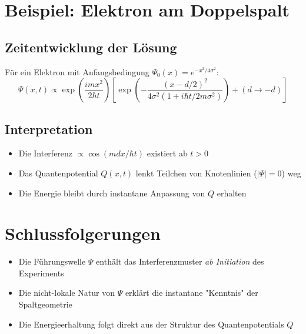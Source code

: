 \documentclass[12pt]{article}
\begin{document}
\section{Beispiel: Elektron am Doppelspalt}

\subsection{Zeitentwicklung der Lösung}
Für ein Elektron mit Anfangsbedingung $\Psi_0(x) = e^{-x^2/4\sigma^2}$:
\begin{equation}
\Psi(x,t) \propto \exp\left( \frac{imx^2}{2\hbar t} \right) \left[ \exp\left( -\frac{(x-d/2)^2}{4\sigma^2(1 + i\hbar t/2m\sigma^2)} \right) + (d \to -d) \right]
\end{equation}

\subsection{Interpretation}
\begin{itemize}
\item Die Interferenz $\propto \cos(mdx/\hbar t)$ existiert ab $t > 0$
\item Das Quantenpotential $Q(x,t)$ lenkt Teilchen von Knotenlinien ($|\Psi|=0$) weg
\item Die Energie bleibt durch instantane Anpassung von $Q$ erhalten
\end{itemize}

\section{Schlussfolgerungen}
\begin{itemize}
\item Die Führungswelle $\Psi$ enthält das Interferenzmuster \textit{ab Initiation} des Experiments
\item Die nicht-lokale Natur von $\Psi$ erklärt die instantane "Kenntnis" der Spaltgeometrie
\item Die Energieerhaltung folgt direkt aus der Struktur des Quantenpotentials $Q$
\end{itemize}
\end{document}
